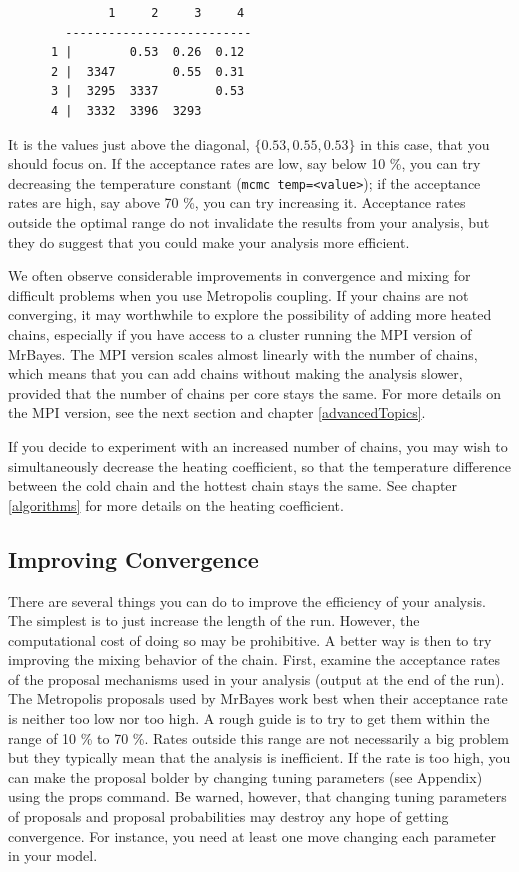 \documentclass[12pt]{book}
\begin{document}
\small
\begin{singlespacing}
\begin{verbatim}
              1     2     3     4 
        --------------------------
      1 |        0.53  0.26  0.12 
      2 |  3347        0.55  0.31 
      3 |  3295  3337        0.53 
      4 |  3332  3396  3293       
\end{verbatim}
\end{singlespacing}
\normalsize

It is the values just above the diagonal, $\{0.53, 0.55, 0.53\}$ in this case, that you should focus on. If 
the acceptance rates are low, say below 10 \%, you can try decreasing the temperature constant
(\texttt{mcmc temp=<value>}); if the acceptance rates are high, say above 70 \%, you can try increasing it.
Acceptance rates outside the optimal range do not invalidate the results from your analysis, but they do
suggest that you could make your analysis more efficient.

We often observe considerable improvements in convergence and mixing for difficult problems when you
use Metropolis coupling. If your chains are not converging, it may worthwhile to explore the possibility
of adding more heated chains, especially if you have access to a cluster running the MPI version of MrBayes.
The MPI version scales almost linearly with the number of chains, which means that you can add chains
without making the analysis slower, provided that the number of chains per core stays the same. For more
details on the MPI version, see the next section and chapter \ref{advancedTopics}.

If you decide to experiment with an increased number of chains, you may wish to simultaneously decrease
the heating coefficient, so that the temperature difference between the cold chain and the hottest chain
stays the same. See chapter \ref{algorithms} for more details on the heating coefficient.


\subsection{Improving Convergence}
There are several things you can do to improve the efficiency of your analysis. The
simplest is to just increase the length of the run. However, the computational cost of
doing so may be prohibitive. A better way is then to try improving the mixing behavior of
the chain. First, examine the acceptance rates of the proposal mechanisms used in your
analysis (output at the end of the run). The Metropolis proposals used by MrBayes work
best when their acceptance rate is neither too low nor too high. A rough guide is to try to
get them within the range of 10 \% to 70 \%. Rates outside this range are not necessarily a
big problem but they typically mean that the analysis is inefficient. If the rate is too high,
you can make the proposal bolder by changing tuning parameters (see Appendix) using
the props command. Be warned, however, that changing tuning parameters of proposals
and proposal probabilities may destroy any hope of getting convergence. For instance,
you need at least one move changing each parameter in your model.
\end{document}

